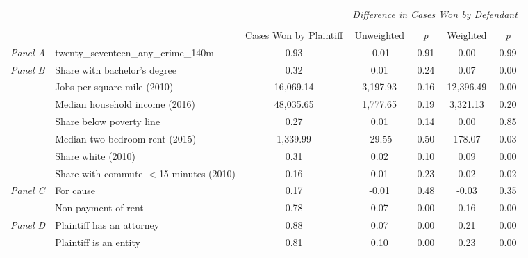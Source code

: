 \begin{tabular}{llccccc}
\toprule
 &  & \textit{} & \multicolumn{4}{c}{\textit{Difference in Cases Won by Defendant}} \\
\cline{4-7}
\\
 &  & Cases Won by Plaintiff & Unweighted & \emph{p} & Weighted & \emph{p} \\
\midrule
\textit{Panel A} & twenty_seventeen_any_crime_140m & 0.93 & -0.01 & 0.91 & 0.00 & 0.99 \\
\cline{1-7}
\multirow[c]{7}{3cm}{\textit{Panel B}} & Share with bachelor's degree & 0.32 & 0.01 & 0.24 & 0.07 & 0.00 \\
 & Jobs per square mile (2010) & 16,069.14 & 3,197.93 & 0.16 & 12,396.49 & 0.00 \\
 & Median household income (2016) & 48,035.65 & 1,777.65 & 0.19 & 3,321.13 & 0.20 \\
 & Share below poverty line & 0.27 & 0.01 & 0.14 & 0.00 & 0.85 \\
 & Median two bedroom rent (2015) & 1,339.99 & -29.55 & 0.50 & 178.07 & 0.03 \\
 & Share white (2010) & 0.31 & 0.02 & 0.10 & 0.09 & 0.00 \\
 & Share with commute $<$15 minutes (2010) & 0.16 & 0.01 & 0.23 & 0.02 & 0.02 \\
\cline{1-7}
\multirow[c]{2}{3cm}{\textit{Panel C}} & For cause & 0.17 & -0.01 & 0.48 & -0.03 & 0.35 \\
 & Non-payment of rent & 0.78 & 0.07 & 0.00 & 0.16 & 0.00 \\
\cline{1-7}
\multirow[c]{2}{3cm}{\textit{Panel D}} & Plaintiff has an attorney & 0.88 & 0.07 & 0.00 & 0.21 & 0.00 \\
 & Plaintiff is an entity & 0.81 & 0.10 & 0.00 & 0.23 & 0.00 \\
\cline{1-7}
\bottomrule
\end{tabular}
